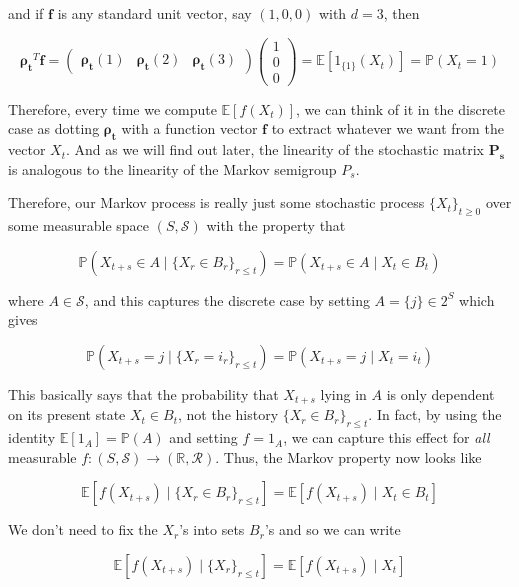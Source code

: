 \documentclass{article}
\theoremstyle{definition}
\theoremstyle{remark}
\theoremstyle{definition}
\begin{document}
    and if $\mathbf{f}$ is any standard unit vector, say $(1, 0, 0)$ with $d = 3$, then

      \[\boldsymbol{\rho_t}^T \mathbf{f}  = \begin{pmatrix} \boldsymbol{\rho_t} (1) & \boldsymbol{\rho_t} (2) & \boldsymbol{\rho_t} (3) \end{pmatrix} \begin{pmatrix} 1 \\ 0 \\ 0 \end{pmatrix}= \mathbb{E}[1_{\{1\}} (X_t)] = \mathbb{P}(X_t = 1)\]

    Therefore, every time we compute $\mathbb{E}[f(X_t)]$, we can think of it in the discrete case as dotting $\boldsymbol{\rho_t}$ with a function vector $\mathbf{f}$ to extract whatever we want from the vector $X_t$. And as we will find out later, the linearity of the stochastic matrix $\mathbf{P_s}$ is analogous to the linearity of the Markov semigroup $P_s$.  

    Therefore, our Markov process is really just some stochastic process $\{X_t\}_{t \geq 0}$ over some measurable space $(S, \mathcal{S})$ with the property that 

      \[\mathbb{P}(X_{t + s} \in A \mid \{X_r \in B_r\}_{r \leq t}) = \mathbb{P}( X_{t + s} \in A \mid X_t \in B_t)\]

    where $A \in \mathcal{S}$, and this captures the discrete case by setting $A = \{j\} \in 2^S$ which gives 

      \[\mathbb{P}( X_{t + s} = j \mid \{X_r = i_r\}_{r \leq t}) = \mathbb{P}( X_{t + s} = j \mid X_t = i_t)\]

    This basically says that the probability that $X_{t + s}$ lying in $A$ is only dependent on its present state $X_t \in B_t$, not the history $\{X_r \in B_r\}_{r \leq t}$. In fact, by using the identity $\mathbb{E}[1_A] = \mathbb{P}(A)$ and setting $f = 1_A$, we can capture this effect for \textit{all} measurable $f: (S, \mathcal{S}) \rightarrow (\mathbb{R}, \mathcal{R})$. Thus, the Markov property now looks like  

      \[\mathbb{E}[f (X_{t + s}) \mid \{X_r \in B_r\}_{r \leq t}] = \mathbb{E}[ f(X_{t + s}) \mid X_t \in B_t]\]

    We don't need to fix the $X_r$'s into sets $B_r$'s and so we can write 

      \[\mathbb{E}[f (X_{t + s}) \mid \{X_r\}_{r \leq t}] = \mathbb{E}[ f(X_{t + s}) \mid X_t]\]
\end{document}
